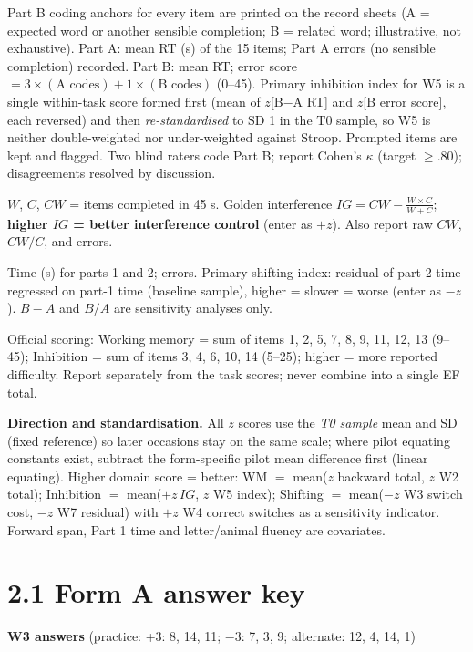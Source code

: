 \documentclass[10pt,a4paper]{article}
\begin{document}
\begin{description}[style=nextline,leftmargin=0.6cm,itemsep=3pt]
\item[W5 Finishing sentences] Part B coding anchors for every item are printed on the record sheets (A = expected word or another sensible completion; B = related word; illustrative, not exhaustive). Part A: mean RT (s) of the 15 items; Part A errors (no sensible completion) recorded. Part B: mean RT; error score $= 3\times(\text{A codes}) + 1\times(\text{B codes})$ (0--45). Primary inhibition index for W5 is a single within-task score formed first (mean of $z$[B$-$A RT] and $z$[B error score], each reversed) and then \emph{re-standardised} to SD 1 in the T0 sample, so W5 is neither double-weighted nor under-weighted against Stroop. Prompted items are kept and flagged. Two blind raters code Part B; report Cohen's $\kappa$ (target $\ge .80$); disagreements resolved by discussion.
\item[W6 Colours] $W$, $C$, $CW$ = items completed in 45 s. Golden interference $IG = CW - \frac{W\times C}{W+C}$; \textbf{higher $IG$ = better interference control} (enter as $+z$). Also report raw $CW$, $CW/C$, and errors.
\item[W7 Joining circles] Time (s) for parts 1 and 2; errors. Primary shifting index: residual of part-2 time regressed on part-1 time (baseline sample), higher = slower = worse (enter as $-z$). $B-A$ and $B/A$ are sensitivity analyses only.
\item[W8 ADEXI] Official scoring: Working memory = sum of items 1, 2, 5, 7, 8, 9, 11, 12, 13 (9--45); Inhibition = sum of items 3, 4, 6, 10, 14 (5--25); higher = more reported difficulty. Report separately from the task scores; never combine into a single EF total.
\end{description}
\textbf{Direction and standardisation.} All $z$ scores use the \emph{T0 sample} mean and SD (fixed reference) so later occasions stay on the same scale; where pilot equating constants exist, subtract the form-specific pilot mean difference first (linear equating). Higher domain score = better: WM $=$ mean($z$ backward total, $z$ W2 total); Inhibition $=$ mean($+z\,IG$, $z$ W5 index); Shifting $=$ mean($-z$ W3 switch cost, $-z$ W7 residual) with $+z$ W4 correct switches as a sensitivity indicator. Forward span, Part 1 time and letter/animal fluency are covariates.
\clearpage\section*{2.1 Form A answer key}
\textbf{W3 answers} (practice: +3: 8, 14, 11; $-$3: 7, 3, 9; alternate: 12, 4, 14, 1)\par
\end{document}
